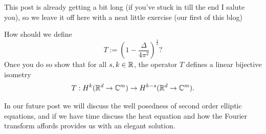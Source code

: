 \documentclass[
    a4paper,
    DIV=14,
    abstract=true,
    numbers=noenddot
]{scrartcl}
\begin{document}
This post is already getting a bit long (if you've stuck in till the end I salute you), so we leave it off here with a neat little exercise (our first of this blog)
\begin{exercise}
	How should we define $$T:=\left(1-\frac{\Delta}{4\pi ^2}  \right)^\frac{s}{2}\text{?} $$ Once you do so show that for all $s,k \in \mathbb{R}$, the operator $T$ defines a linear bijective isometry
	\begin{equation*}
		T: H^k(\mathbb{R}^d\to\mathbb{C}^m)\to H^{k-s}(\mathbb{R}^d\to\mathbb{C}^m).
	\end{equation*}
\end{exercise}
In our future post we will discuss the well posedness of second order elliptic equations, and if we have time discuss the heat equation and how the Fourier transform affords provides us with an elegant solution.




\end{document}
